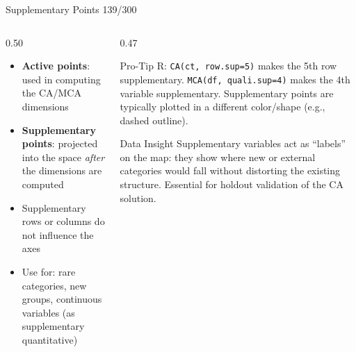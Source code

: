 \documentclass[10pt]{beamer}
\newcommand{\smark}[1]{\hfill{\scriptsize\color{codegray}#1}}
\begin{document}
\begin{frame}{Supplementary Points}
\smark{139/300}
\begin{columns}[T]
\begin{column}{0.50\textwidth}
\begin{itemize}
    \item \textbf{Active points}: used in computing the CA/MCA dimensions
    \item \textbf{Supplementary points}: projected into the space \emph{after} the dimensions are computed
    \item Supplementary rows or columns do not influence the axes
    \item Use for: rare categories, new groups, continuous variables (as supplementary quantitative)
\end{itemize}
\end{column}
\begin{column}{0.47\textwidth}
\begin{alertblock}{Pro-Tip}
    \scriptsize R: \texttt{CA(ct, row.sup=5)} makes the 5th row supplementary. \texttt{MCA(df, quali.sup=4)} makes the 4th variable supplementary. Supplementary points are typically plotted in a different color/shape (e.g., dashed outline).
\end{alertblock}
\vspace{0.1cm}
\begin{exampleblock}{Data Insight}
    \scriptsize Supplementary variables act as ``labels'' on the map: they show where new or external categories would fall without distorting the existing structure. Essential for holdout validation of the CA solution.
\end{exampleblock}
\end{column}
\end{columns}
\end{frame}
\end{document}

